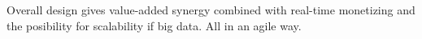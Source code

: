 Overall design gives value-added synergy combined with real-time monetizing and the posibility for scalability if big data. All in an agile way.